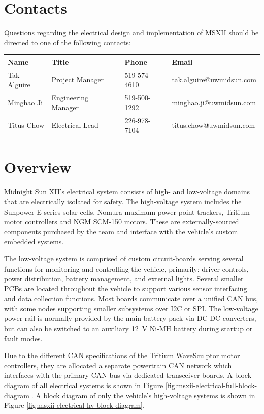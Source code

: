 \documentclass[10pt]{article}
\begin{document}
\section{Contacts}
Questions regarding the electrical design and implementation of MSXII should be directed to one of the following contacts:

\begin{table}[!h]
\centering
\begin{tabular}{llll}
\toprule
Name            & Title               & Phone        & Email \\
\midrule
Tak Alguire     & Project Manager     & 519-574-4610 & tak.alguire@uwmidsun.com \\
Minghao Ji      & Engineering Manager & 519-500-1292 & minghao.ji@uwmidsun.com \\
Titus Chow      & Electrical Lead     & 226-978-7104 & titus.chow@uwmidsun.com \\
\bottomrule
\end{tabular}
\end{table}

\section{Overview}
Midnight Sun XII's electrical system consists of high- and low-voltage domains that are electrically isolated for safety. The high-voltage system includes the Sunpower E-series solar cells, Nomura maximum power point trackers, Tritium motor controllers and NGM SCM-150 motors. These are externally-sourced components purchased by the team and interface with the vehicle's custom embedded systems.

The low-voltage system is comprised of custom circuit-boards serving several functions for monitoring and controlling the vehicle, primarily: driver controls, power distribution, battery management, and external lights. Several smaller PCBs are located throughout the vehicle to support various sensor interfacing and data collection functions. Most boards communicate over a unified CAN bus, with some nodes supporting smaller subsystems over I2C or SPI. The low-voltage power rail is normally provided by the main battery pack via DC-DC converters, but can also be switched to an auxiliary \SI{12}{\volt} Ni-MH battery during startup or fault modes.

Due to the different CAN specifications of the Tritium WaveSculptor motor controllers, they are allocated a separate powertrain CAN network which interfaces with the primary CAN bus via dedicated transceiver boards. A block diagram of all electrical systems is shown in Figure \ref{fig:msxii-electrical-full-block-diagram}. A block diagram of only the vehicle's high-voltage systems is shown in Figure \ref{fig:msxii-electrical-hv-block-diagram}.
\end{document}
